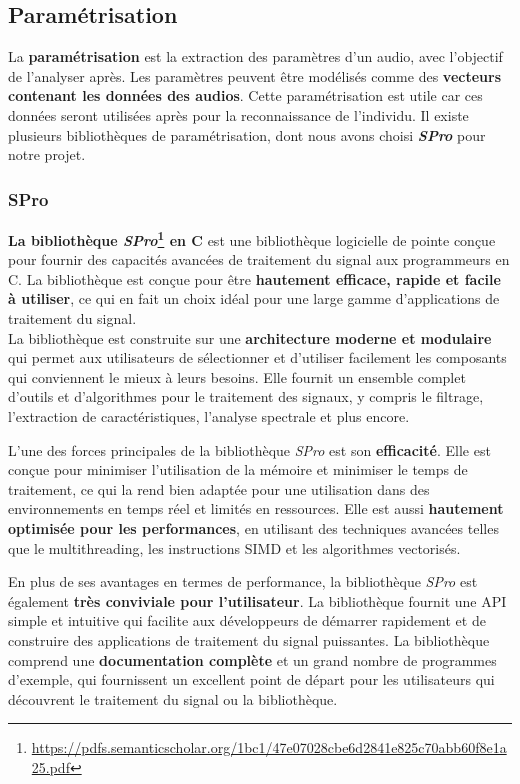 \subsection{Paramétrisation}
\label{subsec:Parametrisation}

La \textbf{paramétrisation} est la extraction des paramètres d'un audio, avec l'objectif de l'analyser après. Les paramètres peuvent être modélisés comme
des \textbf{vecteurs contenant les données des audios}. Cette paramétrisation est utile car ces données seront utilisées après pour la reconnaissance de
l'individu. Il existe plusieurs bibliothèques de paramétrisation, dont nous avons choisi \textbf{\textit{SPro}} pour notre projet.\\


\subsubsection{SPro}
\textbf{La bibliothèque \textit{SPro}\footnote{\url{https://pdfs.semanticscholar.org/1bc1/47e07028cbe6d2841e825c70abb60f8e1a25.pdf}} en C} est une bibliothèque logicielle de pointe conçue pour fournir des capacités avancées de traitement du signal
aux programmeurs en C. La bibliothèque est conçue pour être\textbf{ hautement efficace, rapide et facile à utiliser}, ce qui en fait un choix idéal
pour une large gamme d'applications de traitement du signal.\\

La bibliothèque est construite sur une \textbf{architecture moderne et modulaire} qui permet aux utilisateurs de sélectionner et d'utiliser facilement
les composants qui conviennent le mieux à leurs besoins. Elle fournit un ensemble complet d'outils et d'algorithmes pour le traitement des signaux,
y compris le filtrage, l'extraction de caractéristiques, l'analyse spectrale et plus encore.

L'une des forces principales de la bibliothèque \textit{SPro} est son \textbf{efficacité}. Elle est conçue pour minimiser l'utilisation de la
mémoire et minimiser le temps de traitement, ce qui la rend bien adaptée pour une utilisation dans des environnements en temps réel et limités en ressources.
Elle est aussi \textbf{ hautement optimisée pour les performances}, en utilisant des techniques avancées telles que le multithreading, les instructions SIMD
et les algorithmes vectorisés.

En plus de ses avantages en termes de performance, la bibliothèque \textit{SPro} est également \textbf{très conviviale pour l'utilisateur}. La bibliothèque
fournit une API simple et intuitive qui facilite aux développeurs de démarrer rapidement et de construire des applications de traitement du signal puissantes.
La bibliothèque comprend une \textbf{documentation complète} et un grand nombre de programmes d'exemple, qui fournissent un excellent point de départ pour les
utilisateurs qui découvrent le traitement du signal ou la bibliothèque.\\



